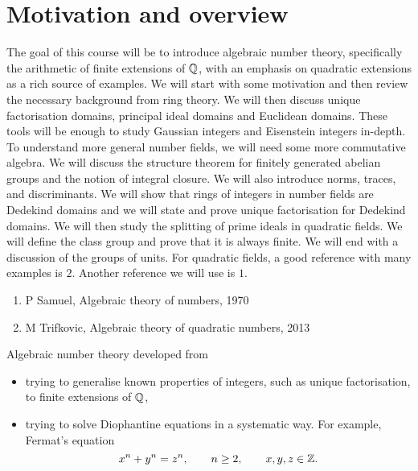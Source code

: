 \def\module{M3P15 Algebraic Number Theory}
\def\lecturer{Dr Ana Caraiani}
\def\term{Spring 2019}

\def\thm{subsection}







\section{Motivation and overview}


The goal of this course will be to introduce algebraic number theory, specifically the arithmetic of finite extensions of $ \mathbb{Q} $, with an emphasis on quadratic extensions as a rich source of examples. We will start with some motivation and then review the necessary background from ring theory. We will then discuss unique factorisation domains, principal ideal domains and Euclidean domains. These tools will be enough to study Gaussian integers and Eisenstein integers in-depth. To understand more general number fields, we will need some more commutative algebra. We will discuss the structure theorem for finitely generated abelian groups and the notion of integral closure. We will also introduce norms, traces, and discriminants. We will show that rings of integers in number fields are Dedekind domains and we will state and prove unique factorisation for Dedekind domains. We will then study the splitting of prime ideals in quadratic fields. We will define the class group and prove that it is always finite. We will end with a discussion of the groups of units. For quadratic fields, a good reference with many examples is $ 2 $. Another reference we will use is $ 1 $.
\begin{enumerate}
\item P Samuel, Algebraic theory of numbers, 1970
\item M Trifkovic, Algebraic theory of quadratic numbers, 2013
\end{enumerate}

Algebraic number theory developed from
\begin{itemize}
\item trying to generalise known properties of integers, such as unique factorisation, to finite extensions of $ \mathbb{Q} $,
\item trying to solve Diophantine equations in a systematic way. For example, Fermat's equation
$$ x^n + y^n = z^n, \qquad n \ge 2, \qquad x, y, z \in \mathbb{Z}. $$
\end{itemize}

